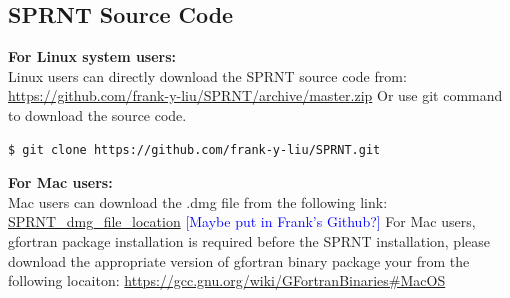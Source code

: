 \documentclass[12pt, letterpaper]{article}
\newcommand{\add}[1]{\textcolor{blue}{#1}}
\begin{document}
\subsection{SPRNT Source Code}
\textbf{For Linux system users:}\newline
\\
Linux users can directly download the SPRNT source code from: 
\newline
\newline
\url{https://github.com/frank-y-liu/SPRNT/archive/master.zip} 
\newline
\newline
Or use git command to download the source code. \newline
\begin{lstlisting}[frame=single]
$ git clone https://github.com/frank-y-liu/SPRNT.git
\end{lstlisting}
\textbf{For Mac users:}\newline
\\
Mac users can download the .dmg file from the following link:
\newline
\newline
\url{SPRNT_dmg_file_location} \add{[Maybe put in Frank's Github?]}
\newline
\newline
For Mac users, gfortran package installation is required before the SPRNT installation, please download the appropriate version of gfortran binary package your from the following locaiton: \newline
\newline
\url{https://gcc.gnu.org/wiki/GFortranBinaries#MacOS}
\newline
{}


%
%
%
\end{document}
